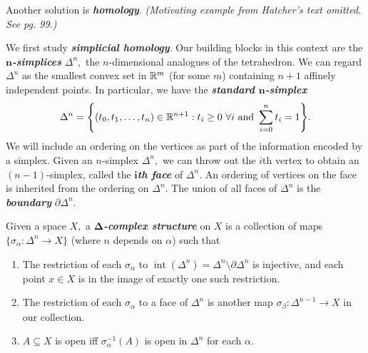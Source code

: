 \documentclass{article}
\begin{document}
Another solution is \textbf{\emph{homology}}. \emph{(Motivating example from Hatcher's text omitted. See pg. 99.)}%

We first study \textbf{\emph{simplicial homology}}. Our building blocks in this context are the \textbf{\emph{$\bm{n}$-simplices}} $\Delta^n,$ the $n$-dimensional analogues of the tetrahedron. We can regard $\Delta^n$ as the smallest convex set in $\mathbb{R}^m$ (for some $m$) containing $n+1$ affinely independent points. In particular, we have the \textbf{\emph{standard $\bm{n}$-simplex}}%
\noindent\noindent\[%
\Delta^n = \qty{(t_0, t_1, \dots, t_n) \in \R^{n+1} :
  t_i \ge 0\ \forall i \text{ and } \sum_{i=0}^n t_i = 1}.
\]%
\noindent{}We will include an ordering on the vertices as part of the information encoded by a simplex. Given an $n$-simplex $\Delta^n,$ we can throw out the $i$th vertex to obtain an $(n-1)$-simplex, called the \textbf{\emph{$\bm{i}$th face}} of $\Delta^n.$ An ordering of vertices on the face is inherited from the ordering on $\Delta^n.$ The union of all faces of $\Delta^n$ is the \textbf{\emph{boundary}} $\partial \Delta^n.$

Given a space $X,$ a \textbf{\emph{$\bm{\Delta}$-complex structure}} on $X$ is a collection of maps $\{\sigma_\alpha: \Delta^n \to X\}$ (where $n$ depends on $\alpha$) such that%

\begin{enumerate}%

\item{}
The restriction of each $\sigma_\alpha$ to $\operatorname{int}(\Delta^n) = \Delta^n \setminus \partial \Delta^n$ is injective, and each point $x \in X$ is in the image of exactly one such restriction.%

\item{}
The restriction of each $\sigma_\alpha$ to a face of $\Delta^n$ is another map $\sigma_\beta: \Delta^{n-1} \to X$ in our collection.%

\item{}
$A \subseteq X$ is open iff $\sigma_\alpha^{-1}(A)$ is open in $\Delta^n$ for each $\alpha.$%
\end{enumerate}%
\end{document}
